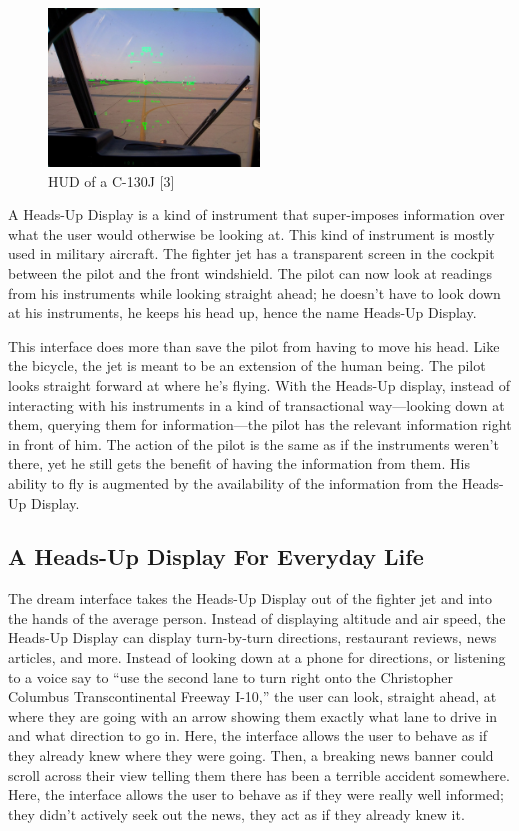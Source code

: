 \documentclass[a4paper,12pt]{article}
\begin{document}
\begin{figure}
\centering
\includegraphics[width=0.5\textwidth]{jethud}
\caption{HUD of a C-130J [3]}
\end{figure}

A Heads-Up Display is a kind of instrument that super-imposes information over what the user would otherwise be looking at. This kind of instrument is mostly used in military aircraft. The fighter jet has a transparent screen in the cockpit between the pilot and the front windshield. The pilot can now look at readings from his instruments while looking straight ahead; he doesn't have to look down at his instruments, he keeps his head up, hence the name Heads-Up Display.

This interface does more than save the pilot from having to move his head. Like the bicycle, the jet is meant to be an extension of the human being. The pilot looks straight forward at where he's flying. With the Heads-Up display, instead of interacting with his instruments in a kind of transactional way---looking down at them, querying them for information---the pilot has the relevant information right in front of him. The action of the pilot is the same as if the instruments weren't there, yet he still gets the benefit of having the information from them. His ability to fly is augmented by the availability of the information from the Heads-Up Display.

\subsection{A Heads-Up Display For Everyday Life}

The dream interface takes the Heads-Up Display out of the fighter jet and into the hands of the average person. Instead of displaying altitude and air speed, the Heads-Up Display can display turn-by-turn directions, restaurant reviews, news articles, and more. Instead of looking down at a phone for directions, or listening to a voice say to ``use the second lane to turn right onto the Christopher Columbus Transcontinental Freeway I-10,'' the user can look, straight ahead, at where they are going with an arrow showing them exactly what lane to drive in and what direction to go in. Here, the interface allows the user to behave as if they already knew where they were going. Then, a breaking news banner could scroll across their view telling them there has been a terrible accident somewhere. Here, the interface allows the user to behave as if they were really well informed; they didn't actively seek out the news, they act as if they already knew it.
\end{document}
